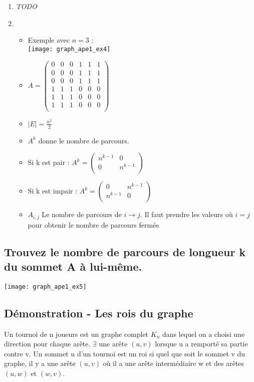 \begin{solution}
\begin{enumerate}
    \item \emph{TODO}
\item
	\begin{itemize}
	\item Exemple avec $n=3$ :\\
	\texttt{[image: graph\_ape1\_ex4]}
	\item 
	 $A = \begin{pmatrix}
	 0&0&0&1&1&1\\
	 0&0&0&1&1&1\\
	 0&0&0&1&1&1\\
	 1&1&1&0&0&0\\
	 1&1&1&0&0&0\\
	 1&1&1&0&0&0\\
	 \end{pmatrix}$

	\item $|E| = \frac{n^{2}}{2}$
		
	\item $A^{k} $ donne le nombre de parcours.
	\item Si k est pair :
	 $A^{k} =  \left(
	 \begin{array}{c|c}
	 n^{k-1} & 0\\
	 \hline
	 0 & n^{k-1}\\
	 \end{array}
	 \right)
	 $
	\item Si k est impair :
	 $A^{k} =  \left(
	 \begin{array}{c|c}
	 0 & n^{k-1}\\
	 \hline
	 n^{k-1}&0\\
	 \end{array}
	 \right)
	 $
	\item $A_{i,j}$ Le nombre de parcours de $i \rightarrow j$. Il faut prendre les valeurs où $i = j$ pour obtenir le nombre de parcours fermés
\end{itemize}
\end{enumerate}
\end{solution}

\subsection{Trouvez le nombre de parcours de longueur k du sommet A à lui-même.}
\texttt{[image: graph\_ape1\_ex5]}


\subsection{Démonstration - Les rois du graphe}
Un tournoi de n joueurs est un graphe complet $K_{n}$ dans lequel on a choisi une direction pour chaque arête. $\exists$ une arête $(u,v)$ lorsque u a remporté sa partie contre v. Un sommet u d'un tournoi est un roi si quel que soit le sommet v du graphe, il y a une arête $(u,v)$ où il a une arête intermédiaire w et des arêtes $(u,w)$ et $(w,v)$.


